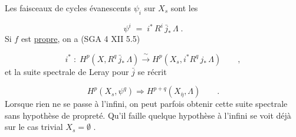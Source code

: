 \begin{center}
\end{center}
Les faisceaux de cycles évanescents  $\psi_i$  sur  $X_s$  sont les

\begin{equation*}\tag{2.2.1}
\psi^i \;=\; i^{*}\, R^i\, \bar{j}_{*}\, \Lambda \;.
\end{equation*}
Si  $f$  est \underline{propre}, on a (SGA 4 XII 5.5)

\begin{equation*}\tag{2.2.2}
i^{*} \;:\; H^p(X,R^q\,\bar{j}_{*}\,\Lambda) \xrightarrow{\ \sim\ } H^p(X_s,i^{*}R^q\,j_{*}\,\Lambda) \qquad ,
\end{equation*}
et la suite spectrale de Leray pour  $\bar{j}$  se récrit

\begin{equation*}\tag{2.2.3}
H^p(X_s,\psi^q) \Longrightarrow H^{p+q}(X_{\bar{\eta}},\Lambda) \qquad .
\end{equation*}
Lorsque rien ne se passe à l'infini, on peut parfois obtenir cette suite spectrale sans hypothèse de propreté.  Qu'il faille quelque hypothèse à l'infini se voit déjà sur le cas trivial  $X_s = \emptyset$ .

